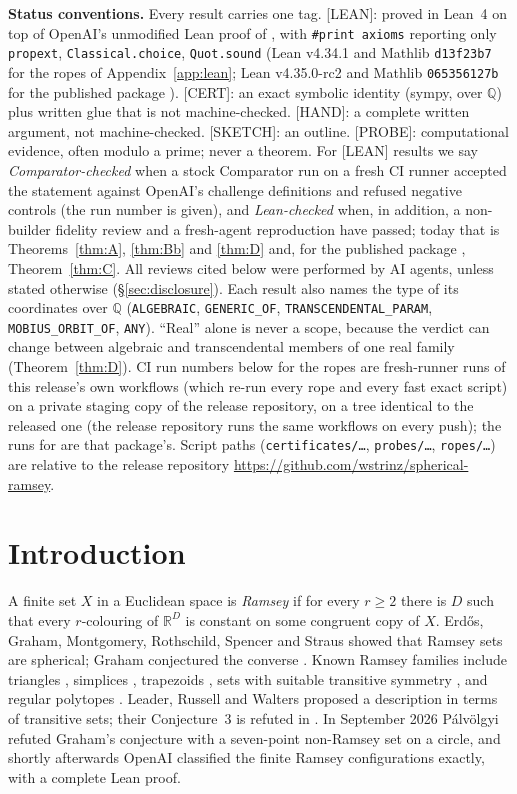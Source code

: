 \documentclass[11pt]{amsart}
\newcommand{\st}[1]{\textsf{[#1]}}
\newcommand{\Q}{\mathbb{Q}}
\newcommand{\R}{\mathbb{R}}
\theoremstyle{plain}
\theoremstyle{definition}
\begin{document}
\noindent\textbf{Status conventions.} Every result carries one tag.
\st{LEAN}: proved in Lean~4 on top of OpenAI's unmodified Lean proof of \cite{OAI172}, with
\texttt{\#print axioms} reporting only \texttt{propext}, \texttt{Classical.choice},
\texttt{Quot.sound} (Lean v4.34.1 and Mathlib \texttt{d13f23b7} for the ropes of
Appendix~\ref{app:lean}; Lean v4.35.0-rc2 and Mathlib \texttt{065356127b} for the published package
\cite{MR}).
\st{CERT}: an exact symbolic identity (sympy, over $\Q$) plus written glue that is not
machine-checked.
\st{HAND}: a complete written argument, not machine-checked.
\st{SKETCH}: an outline.
\st{PROBE}: computational evidence, often modulo a prime; never a theorem.
For \st{LEAN} results we say \emph{Comparator-checked} when a stock Comparator \cite{Comparator}
run on a fresh CI runner accepted the statement against OpenAI's challenge definitions and refused
negative controls (the run number is given), and \emph{Lean-checked} when, in addition, a
non-builder fidelity review and a fresh-agent reproduction have passed; today that is
Theorems~\ref{thm:A}, \ref{thm:Bb} and \ref{thm:D} and, for the published package \cite{MR}, Theorem~\ref{thm:C}. All reviews cited below were performed by AI agents, unless stated
otherwise (\S\ref{sec:disclosure}). Each result also names the type of its coordinates over $\Q$
(\texttt{ALGEBRAIC}, \texttt{GENERIC\_OF}, \texttt{TRANSCENDENTAL\_PARAM},
\texttt{MOBIUS\_ORBIT\_OF}, \texttt{ANY}). ``Real'' alone is never a scope, because the verdict
can change between algebraic and transcendental members of one real family
(Theorem~\ref{thm:D}). CI run numbers below for the ropes are fresh-runner runs of this release's
own workflows (which re-run every rope and every fast exact script) on a private staging copy of the
release repository, on a tree identical to the released one (the release repository runs the same
workflows on every push); the runs for \cite{MR} are that package's. Script paths
(\texttt{certificates/\dots}, \texttt{probes/\dots}, \texttt{ropes/\dots}) are relative to the release
repository \url{https://github.com/wstrinz/spherical-ramsey}.

\section{Introduction}

A finite set $X$ in a Euclidean space is \emph{Ramsey} if for every $r\ge2$ there is $D$ such that
every $r$-colouring of $\R^D$ is constant on some congruent copy of $X$. Erd\H{o}s, Graham,
Montgomery, Rothschild, Spencer and Straus \cite{EGMRSS} showed that Ramsey sets are spherical;
Graham conjectured the converse \cite{Graham94}. Known Ramsey families include triangles
\cite{FR86}, simplices \cite{FR90}, trapezoids \cite{Kriz92}, sets with suitable transitive
symmetry \cite{Kriz91}, and regular polytopes \cite{Cantwell}. Leader, Russell and Walters
\cite{LRW12,LRW11} proposed a description in terms of transitive sets; their Conjecture~3 is
refuted in \cite[Cor.~7.5]{OAI172}. In September 2026 P\'alv\"olgyi \cite{Palvolgyi} refuted
Graham's conjecture with a seven-point non-Ramsey set on a circle, and shortly afterwards OpenAI
\cite{OAI172} classified the finite Ramsey configurations exactly, with a complete Lean proof.
\end{document}
